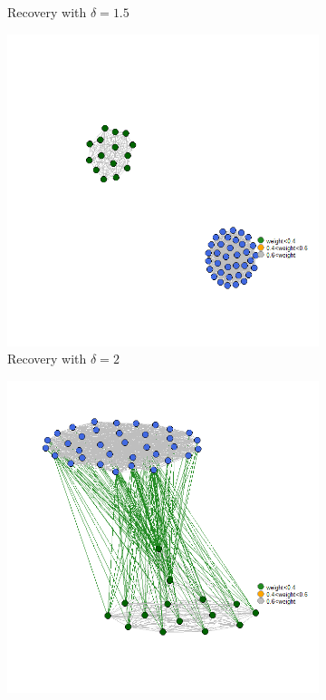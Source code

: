 \documentclass[12pt]{amsart}
\theoremstyle{remark}
\begin{document}
\begin{figure}[H]
\begin{subfigure}[b]{0.37\textwidth}
         \caption{Recovery with $\delta=1.5$}
     \end{subfigure}
     \hfill
     \begin{subfigure}[b]{0.37\textwidth}
         \centering
         \includegraphics[width=\textwidth]{./Pictures/recupera6.png}
         \caption{Recovery with $\delta=2$}
     \end{subfigure}
     \hfill
     \begin{subfigure}[b]{0.37\textwidth}
         \centering
         \includegraphics[width=\textwidth]{./Pictures/recupera7.png}

\end{subfigure}
\end{figure}
\end{document}
